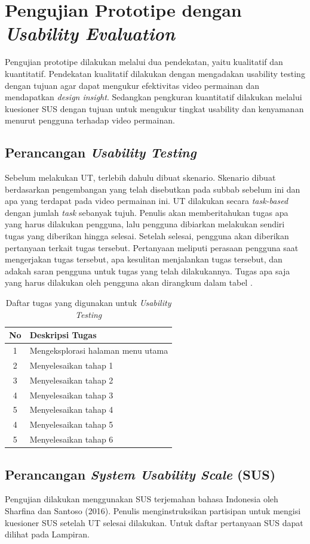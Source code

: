 \section{Pengujian Prototipe dengan \textit{Usability Evaluation}}
Pengujian prototipe dilakukan melalui dua pendekatan, yaitu kualitatif dan kuantitatif. Pendekatan kualitatif dilakukan dengan mengadakan usability testing dengan tujuan agar dapat mengukur efektivitas video permainan dan mendapatkan \textit{design insight}. Sedangkan pengkuran kuantitatif dilakukan melalui kuesioner SUS dengan tujuan untuk mengukur tingkat usability dan kenyamanan menurut pengguna terhadap video permainan.

	\subsection{Perancangan \textit{Usability Testing}}
	Sebelum melakukan UT, terlebih dahulu dibuat skenario. Skenario dibuat berdasarkan pengembangan yang telah disebutkan pada subbab sebelum ini dan apa yang terdapat pada video permainan ini. UT dilakukan secara \textit{task-based} dengan jumlah \textit{task} sebanyak tujuh. Penulis akan memberitahukan tugas apa yang harus dilakukan pengguna, lalu pengguna dibiarkan melakukan sendiri tugas yang diberikan hingga selesai. Setelah selesai, pengguna akan diberikan pertanyaan terkait tugas tersebut. Pertanyaan meliputi perasaan pengguna saat mengerjakan tugas tersebut, apa kesulitan menjalankan tugas tersebut, dan adakah saran pengguna untuk tugas yang telah dilakukannya. Tugas apa saja yang harus dilakukan oleh pengguna akan dirangkum dalam tabel .
	\begin{longtable}{| c | p{7cm} |}
		\caption{Daftar tugas yang digunakan untuk \textit{Usability Testing}} \\
		\hline
		No & Deskripsi Tugas \\ 
		\hline
		\endhead
		1 & Mengeksplorasi halaman menu utama \\ 
		\hline
		2 & Menyelesaikan tahap 1 \\ \hline
		3 & Menyelesaikan tahap 2 \\ \hline
		4 & Menyelesaikan tahap 3 \\ \hline
		5 & Menyelesaikan tahap 4 \\ \hline
		4 & Menyelesaikan tahap 5 \\ \hline
		5 & Menyelesaikan tahap 6 \\ \hline
	\end{longtable}
	\subsection{Perancangan \textit{System Usability Scale} (SUS)}
	Pengujian dilakukan menggunakan SUS terjemahan bahasa Indonesia oleh Sharfina dan Santoso (2016). Penulis menginstruksikan partisipan untuk mengisi kuesioner SUS setelah UT selesai dilakukan. Untuk daftar pertanyaan SUS dapat dilihat pada Lampiran.
